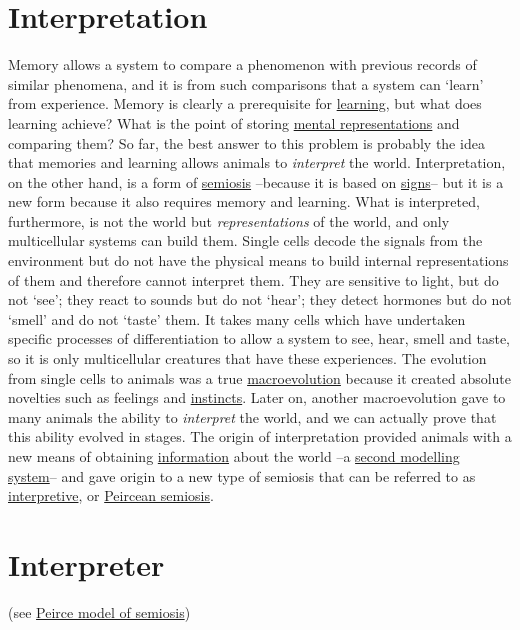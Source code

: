 \documentclass[12pt]{article}
\begin{document}
\section{Interpretation}
Memory allows a system to compare a phenomenon with previous records of similar phenomena, and it is from such comparisons that a system can `learn' from experience. Memory is clearly a prerequisite for \hyperlink{learning}{learning}, but what does learning achieve? What is the point of storing \hyperlink{representations}{mental representations} and comparing them? So far, the best answer to this problem is probably the idea that memories and learning allows animals to \textit{interpret} the world. Interpretation, on the other hand, is a form of \hyperlink{semiosis}{semiosis} --because it is based on \hyperlink{signs}{signs}-- but it is a new form because it also requires memory and learning. What is interpreted, furthermore, is not the world but \textit{representations} of the world, and only multicellular systems can build them. Single cells decode the signals from the environment but do not have the physical means to build internal representations of them and therefore cannot interpret them. They are sensitive to light, but do not `see'; they react to sounds but do not `hear'; they detect hormones but do not `smell' and do not `taste' them. It takes many cells which have undertaken specific processes of differentiation to allow a system to see, hear, smell and taste, so it is only multicellular creatures that have these experiences. The evolution from single cells to animals was a true \hyperlink{macroevolution}{macroevolution} because it created absolute novelties such as feelings and \hyperlink{instinctive_brain}{instincts}. Later on, another macroevolution gave to many animals the ability to \textit{interpret} the world, and we can actually prove that this ability evolved in stages. The origin of interpretation provided animals with a new means of obtaining \hyperlink{information}{information} about the world --a \hyperlink{brains_second_modelling_system}{second modelling system}-- and gave origin to a new type of semiosis that can be referred to as \hyperlink{interpretive_semiosis}{interpretive}, or \hyperlink{peirce_model_of_semiosis}{Peircean semiosis}. 


\hypertarget{interpreter}{}
\section{Interpreter} 

(see \hyperlink{peirce_model_of_semiosis}{Peirce model of semiosis})
\end{document}
